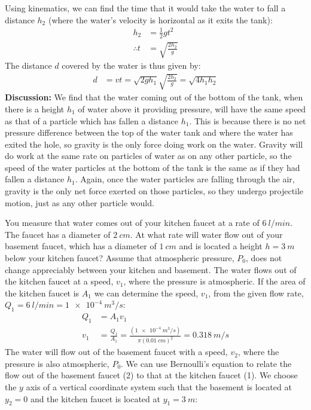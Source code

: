 {{\begin{example}
Using kinematics, we can find the time that it would take the water to fall a distance $h_2$ (where the water's velocity is horizontal as it exits the tank):
\begin{align*}
h_2 &= \frac{1}{2}gt^2\\
\therefore t &= \sqrt{\frac{2h_2}{g}}
\end{align*}
The distance $d$ covered by the water is thus given by:
\begin{align*}
d &= vt = \sqrt{2gh_1}\sqrt{\frac{2h_2}{g}} = \sqrt{4h_1h_2}
\end{align*}
\textbf{Discussion:} We find that the water coming out of the bottom of the tank, when there is a height $h_1$ of water above it providing pressure, will have the same speed as that of a particle which has fallen a distance $h_1$. This is because there is no net pressure difference between the top of the water tank and where the water has exited the hole, so gravity is the only force doing work on the water. Gravity will do work at the same rate on particles of water as on any other particle, so the speed of the water particles at the bottom of the tank is the same as if they had fallen a distance $h_1$. Again, once the water particles are falling through the air, gravity is the only net force exerted on those particles, so they undergo projectile motion, just as any other particle would.
\end{example}
\newpage
\begin{example}{You measure that water comes out of your kitchen faucet at a rate of $\SI{6}{l/min}$. The faucet has a diameter of $\SI{2}{cm}$. At what rate will water flow out of your basement faucet, which has a diameter of $\SI{1}{cm}$ and is located a height $h=\SI{3}{m}$ below your kitchen faucet? Assume that atmospheric pressure, $P_0$, does not change appreciably between your kitchen and basement.}
\label{ex:fluidmechanics:kitchen}
The water flows out of the kitchen faucet at a speed, $v_1$, where the pressure is atmospheric. If the area of the kitchen faucet is $A_1$ we can determine the speed, $v_1$, from the given flow rate, $Q_1=\SI{6}{l/min}=\SI{1e-4}{m^3/s}$:
\begin{align*}
Q_1 &= A_1 v_1\\
v_1 &= \frac{Q_1}{A_1}=\frac{(\SI{1e-4}{m^3/s})}{\pi (\SI{0.01}{cm})^2}=\SI{0.318}{m/s}
\end{align*}
The water will flow out of the basement faucet with a speed, $v_2$, where the pressure is also atmospheric, $P_0$. We can use Bernoulli's equation to relate the flow out of the basement faucet (2) to that at the kitchen faucet (1). We choose the $y$ axis of a vertical coordinate system such that the basement is located at $y_2=0$ and the kitchen faucet is located at $y_1=\SI{3}{m}$:

\end{example}}}
